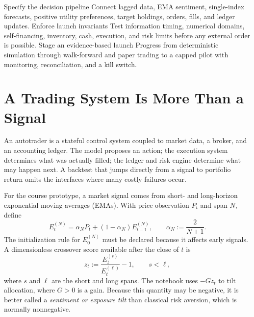 \documentclass[11pt]{article}
\begin{document}

\learningobjectives
  {Specify the decision pipeline}
  {Connect lagged data, EMA sentiment, single-index forecasts, positive utility preferences, target holdings, orders, fills, and ledger updates.}
  {Enforce launch invariants}
  {Test information timing, numerical domains, self-financing, inventory, cash, execution, and risk limits before any external order is possible.}
  {Stage an evidence-based launch}
  {Progress from deterministic simulation through walk-forward and paper trading to a capped pilot with monitoring, reconciliation, and a kill switch.}

\section{A Trading System Is More Than a Signal}

An autotrader is a stateful control system coupled to market data, a broker, and an accounting ledger. The model proposes an action; the execution system determines what was actually filled; the ledger and risk engine determine what may happen next. A backtest that jumps directly from a signal to portfolio return omits the interfaces where many costly failures occur.

For the course prototype, a market signal comes from short- and long-horizon exponential moving averages (EMAs). With price observation $P_t$ and span $N$, define
\begin{equation}
  \label{eq:ema}
  E_t^{(N)}=\alpha_NP_t+(1-\alpha_N)E_{t-1}^{(N)},
  \qquad
  \alpha_N:=\frac{2}{N+1}.
\end{equation}
The initialization rule for $E_0^{(N)}$ must be declared because it affects early signals. A dimensionless crossover score available after the close of $t$ is
\begin{equation}
  \label{eq:sentiment}
  z_t:=\frac{E_t^{(s)}}{E_t^{(\ell)}}-1,
  \qquad s<\ell,
\end{equation}
where $s$ and $\ell$ are the short and long spans. The notebook uses $-Gz_t$ to tilt allocation, where $G>0$ is a gain. Because this quantity may be negative, it is better called a \emph{sentiment or exposure tilt} than classical risk aversion, which is normally nonnegative.
\end{document}
